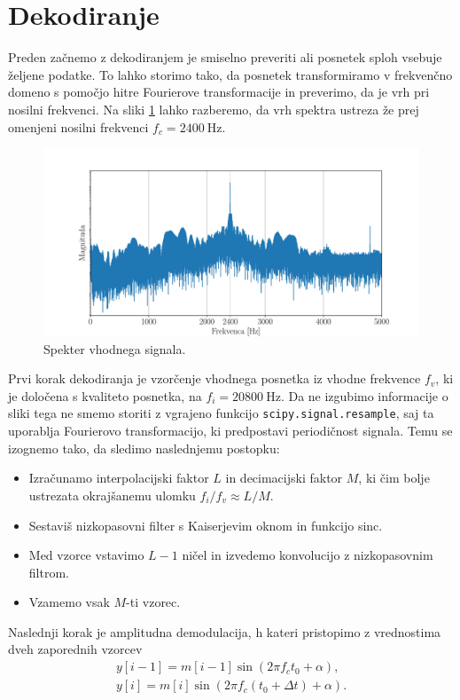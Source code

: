 \documentclass{article}
\begin{document}
\section{Dekodiranje}
Preden začnemo z dekodiranjem je smiselno preveriti ali posnetek sploh vsebuje željene podatke. To lahko storimo tako, da posnetek transformiramo v frekvenčno domeno s pomočjo hitre Fourierove transformacije in preverimo, da je vrh pri nosilni frekvenci. Na sliki \ref{fig:fft} lahko razberemo, da vrh spektra ustreza že prej omenjeni nosilni frekvenci $f_c=\SI{2400}{\hertz}$.
\begin{figure}[H]
    \centering
    \includegraphics[width=1\textwidth]{fft_plot.pdf}
    \caption{Spekter vhodnega signala.}
    \label{fig:fft}
\end{figure}
Prvi korak dekodiranja je vzorčenje vhodnega posnetka iz vhodne frekvence $f_v$, ki je določena s kvaliteto posnetka, na $f_i=\SI{20800}{\hertz}$. Da ne izgubimo informacije o sliki tega ne smemo storiti z vgrajeno funkcijo \texttt{scipy.signal.resample}, saj ta uporablja Fourierovo transformacijo, ki predpostavi periodičnost signala. Temu se izognemo tako, da sledimo naslednjemu postopku:
\begin{itemize}
  \item Izračunamo interpolacijski faktor $L$ in decimacijski faktor $M$, ki čim bolje ustrezata okrajšanemu ulomku $f_i/f_v\approx L/M$.
  \item Sestaviš nizkopasovni filter s Kaiserjevim oknom in funkcijo sinc.
  \item Med vzorce vstavimo $L-1$ ničel in izvedemo konvolucijo z nizkopasovnim filtrom.
  \item Vzamemo vsak $M$-ti vzorec.
\end{itemize}
Naslednji korak je amplitudna demodulacija, h kateri pristopimo z vrednostima dveh zaporednih vzorcev
\begin{align*}
	y[i-1] = m[i-1]\sin{(2\pi f_c t_0 + \alpha)}\text{,} \\
	y[i] = m[i]\sin{(2\pi f_c (t_0 + \Delta t) + \alpha)}\text{.}
\end{align*}
\end{document}
